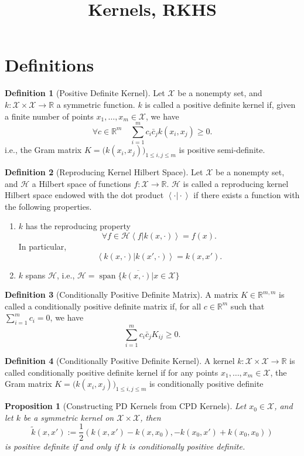 \documentclass{article}
\theoremstyle{plain}
\newtheorem{prop}[thm]{Proposition}
\theoremstyle{definition}
\newtheorem{defn}{Definition}[section]
\def\X{\mathcal{X}}
\def\R{\mathbb{R}}
\newcommand{\inner}[2]{\left\langle #1 \vert #2 \right\rangle}
\begin{document}
\title{Kernels, RKHS}
\author{}
\date{}
\maketitle

\section{Definitions}%
\label{sec:definition}

\begin{defn}[Positive Definite Kernel]
    Let $\X$ be a nonempty set, and $k:\X\times\X \to \R$ a symmetric function.
    $k$ is called a positive definite kernel if, given a finite number of
    points $x_1, \dots, x_m \in \X$, we have
    \[
         \forall c \in \R^m \quad
        \sum_{i=1}^{m} c_i \bar c_j k(x_i, x_j) \geq 0.
    \]
i.e., the Gram matrix $K = \big(k(x_i, x_j)\big)_{1 \leq i, j \leq m}$ is positive
semi-definite.
\end{defn}

\begin{defn}[Reproducing Kernel Hilbert Space]
    Let $\X$ be a nonempty set, and $ \mathcal{H}$ a Hilbert space of functions
    $f:\X\to\R$.
    $ \mathcal{H} $ is called a reproducing kernel Hilbert space endowed with
    the dot product $\inner{\cdot}{\cdot}$ if there exists a function
    with the following properties.
    \begin{enumerate}
        \item $k$ has the reproducing property
            \[
                \forall f\in \mathcal{H} \inner{f}{k(x,\cdot)} = f(x).
            \]
            In particular,
            \[
                \inner{k(x, \cdot)}{k(x', \cdot)} = k(x,x').
            \]
        \item $k$ spans $ \mathcal{H}$, i.e., $ \mathcal{H}=\overline{\operatorname{span}
            \{k(x,\cdot) \vert x\in \X\} } $
    \end{enumerate}
\end{defn}

\begin{defn}[Conditionally Positive Definite Matrix]
    A matrix $K \in \R^{m,m}$ is called a conditionally positive definite
    matrix if, for all $c \in \R^m$ such that $\sum_{i=1}^{m} c_i = 0$, we have
    \[
        \sum_{i=1}^{m} c_i \bar c_j K_{ij} \geq 0.
    \]
\end{defn}

\begin{defn}[Conditionally Positive Definite Kernel]
    A kernel $k:\X\times\X \to \R$ is called conditionally positive definite kernel if
    for any points $x_1, \dots, x_m \in \X$, the Gram matrix $K = \big(k(x_i,
    x_j)\big)_{1 \leq i, j \leq m}$ is conditionally positive definite
\end{defn}

\begin{prop}[Constructing PD Kernels from CPD Kernels]
    Let $x_0 \in \X$, and let $k$ be a symmetric kernel on $\X\times\X$, then
    \[
        \tilde k(x,x') := \frac{1}{2} \left(k(x, x') - k(x, x_0), - k(x_0, x') + k(x_0, x_0)\right)
    \]
    is positive definite if and only if $k$ is conditionally positive definite.
\end{prop}
\end{document}
